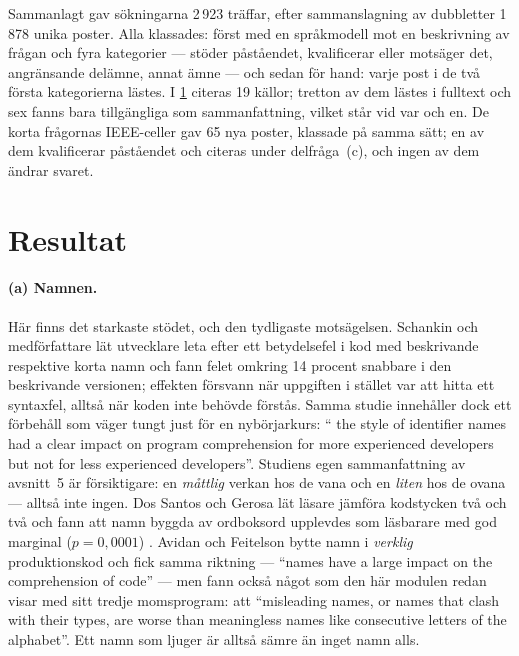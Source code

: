 \endgroup

Sammanlagt gav sökningarna 2\,923 träffar, efter sammanslagning av
dubbletter 1\,878 unika poster.  Alla klassades: först
med en språkmodell mot en beskrivning av frågan och fyra kategorier ---
stöder påståendet, kvalificerar eller motsäger det, angränsande delämne,
annat ämne --- och sedan för hand: varje post i de två första
kategorierna lästes.  I \cref{sec:pep8-resultat} citeras 19 källor;
tretton av dem lästes i fulltext och sex fanns bara tillgängliga som
sammanfattning, vilket står vid var och en.  De korta frågornas
IEEE-celler gav 65 nya poster, klassade på samma sätt; en av dem
kvalificerar påståendet och citeras under delfråga~(c), och ingen av
dem ändrar svaret.

\section{Resultat}
\label{sec:pep8-resultat}

\paragraph{(a) Namnen.}  Här finns det starkaste stödet, och den
tydligaste motsägelsen.  Schankin och medförfattare lät utvecklare leta
efter ett betydelsefel i kod med beskrivande respektive korta namn och
fann felet omkring 14 procent snabbare i den beskrivande
versionen; effekten försvann när uppgiften i stället var att hitta ett
syntaxfel, alltså när koden inte behövde förstås\autocite[avsnitt~5,
7]{Schankin2018Names}.  Samma studie innehåller dock ett förbehåll som
väger tungt just för en nybörjarkurs: \enquote{\foreignlanguage{english}{%
the style of identifier names had a clear impact on program comprehension
for more experienced developers but not for less experienced
developers}}\autocite[sammanfattningen]{Schankin2018Names}.  Studiens
egen sammanfattning av avsnitt~5 är försiktigare: en \emph{måttlig}
verkan hos de vana och en \emph{liten} hos de ovana --- alltså inte
ingen.  Dos Santos och Gerosa lät läsare jämföra kodstycken två
och två och fann att namn byggda av ordboksord upplevdes som läsbarare
med god marginal ($p = 0{,}0001$)%
\autocite[avsnitt~4.2]{SantosGerosa2018Readability}.  Avidan och Feitelson
bytte namn i \emph{verklig} produktionskod och fick samma riktning ---
\enquote{\foreignlanguage{english}{names have a large impact on the
comprehension of code}} --- men fann också något som den här modulen
redan visar med sitt tredje momsprogram: att
\enquote{\foreignlanguage{english}{misleading names, or names that clash
with their types, are worse than meaningless names like consecutive
letters of the alphabet}}\autocite[avsnitt~IX]{Avidan2017VariableNames}.
Ett namn som ljuger är alltså sämre än inget namn alls.


